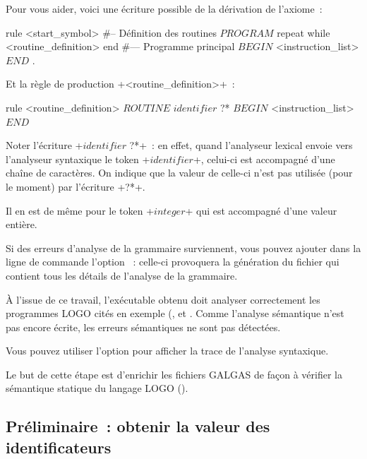 Pour vous aider, voici une écriture possible de la dérivation de l'axiome~:

\begin{galgas}
rule <start_symbol> {
#-- Définition des routines
  $PROGRAM$
  repeat
  while
    <routine_definition>
  end
#--- Programme principal
  $BEGIN$
  <instruction_list> 
  $END$
  $.$
}
\end{galgas}

Et la règle de production \ggs+<routine_definition>+~:

\begin{galgas}
rule <routine_definition> {
  $ROUTINE$
  $identifier$ ?*
  $BEGIN$
  <instruction_list>
  $END$
}
\end{galgas}

Noter l’écriture \ggs+$identifier$ ?*+~: en effet, quand l’analyseur lexical envoie vers l’analyseur syntaxique le token \ggs+$identifier$+, celui-ci est accompagné d’une chaîne de caractères. On indique que la valeur de celle-ci n’est pas utilisée (pour le moment) par l’écriture \ggs+?*+.

Il en est de même pour le token \ggs+$integer$+ qui est accompagné d’une valeur entière.

Si des erreurs d'analyse de la grammaire surviennent, vous pouvez ajouter dans la ligne de commande l'option ~: celle-ci provoquera la génération du fichier \- qui contient tous les détails de l'analyse de la grammaire.

À l'issue de ce travail, l'exécutable obtenu doit analyser correctement les programmes LOGO cités en exemple (,   et . Comme l'analyse sémantique n'est pas encore écrite, les erreurs sémantiques ne sont pas détectées.

Vous pouvez utiliser l'option  pour afficher la trace de l'analyse syntaxique.








Le but de cette étape est d'enrichir les fichiers GALGAS de façon à vérifier la sémantique statique du langage LOGO ().

\subsection{Préliminaire~: obtenir la valeur des identificateurs}

